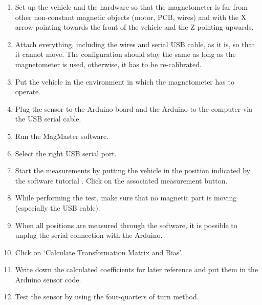 \begin{enumerate}
  \item Set up the vehicle and the hardware so that the magnetometer is far from other non-constant magnetic objects (motor, PCB, wires) and with the X arrow pointing towards the front of the vehicle and the Z pointing upwards.
  \item Attach everything, including the wires and serial USB cable, as it is, so that it cannot move. The configuration should stay the same as long as the magnetometer is used, otherwise, it has to be re-calibrated.
  \item Put the vehicle in the environment in which the magnetometer has to operate.
  \item Plug the sensor to the Arduino board and the Arduino to the computer via the USB serial cable.
  \item Run the MagMaster software.
  \item Select the right USB serial port.
  \item Start the measurements by putting the vehicle in the position indicated by the software tutorial \cite{MagMaster}. Click on the associated measurement button.
  \item While performing the test, make sure that no magnetic part is moving (especially the USB cable).
  \item When all positions are measured through the software, it is possible to unplug the serial connection with the Arduino.
  \item Click on `Calculate Transformation Matrix and Bias'.
  \item Write down the calculated coefficients for later reference and put them in the Arduino sensor code.
  \item Test the sensor by using the four-quarters of turn method.
\end{enumerate}

